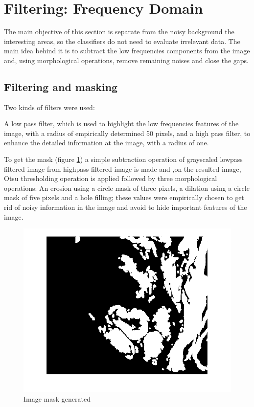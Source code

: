 \documentclass[conference]{IEEEtran}
\begin{document}
	\section{Filtering: Frequency Domain}
		\par The main objective of this section is separate from the noisy background the interesting areas, so the classifiers do not need to evaluate irrelevant data.
		The main idea behind it is to subtract the low frequencies components from the image and, using morphological operations, remove remaining noises and close the gaps.
		\subsection{Filtering and masking}
            \par Two kinds of filters were used:
			\par A low pass filter, which is used to highlight the low frequencies features of the image, with a radius of empirically determined 50 pixels, and a high pass filter, to enhance the detailed information at the image, with a radius of one.
			
			\par To get the mask (figure \ref{fig:mask}) a simple subtraction operation of grayscaled lowpass filtered image from highpass filtered image is made and ,on the resulted image, Otsu thresholding operation is applied followed by three morphological operations: An erosion using a circle mask of three pixels, a dilation using a circle mask of five pixels and a hole filling; these values were empirically chosen to get rid of noisy information in the image and avoid to hide important features of the image.
			
			\begin{figure}[h]
				\centering
				\includegraphics[width=0.7\linewidth]{images/fourrierFiltering/mask}
				\caption{Image mask generated}
				\label{fig:mask}
			\end{figure}
		
\end{document}
